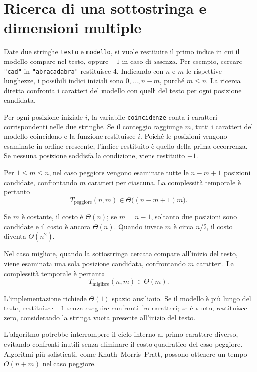 \clearpage

\section{Ricerca di una sottostringa e dimensioni multiple}
\label{sec:fi-complessita-sottostringa}

Date due stringhe \texttt{testo} e \texttt{modello}, si vuole
restituire il primo indice in cui il modello compare nel testo,
oppure \(-1\) in caso di assenza. Per esempio, cercare
\texttt{"cad"} in \texttt{"abracadabra"} restituisce \(4\).
Indicando con \(n\) e \(m\) le rispettive lunghezze, i possibili
indici iniziali sono \(0,\ldots,n-m\), purché \(m\le n\).
La ricerca diretta confronta i caratteri del modello con quelli
del testo per ogni posizione candidata.



Per ogni posizione iniziale \(i\), la variabile
\texttt{coincidenze} conta i caratteri corrispondenti nelle due
stringhe. Se il conteggio raggiunge \(m\), tutti i caratteri
del modello coincidono e la funzione restituisce \(i\).
Poiché le posizioni vengono esaminate in ordine crescente,
l'indice restituito è quello della prima occorrenza.
Se nessuna posizione soddisfa la condizione, viene restituito \(-1\).

Per \(1\le m\le n\), nel caso peggiore vengono esaminate tutte
le \(n-m+1\) posizioni candidate, confrontando \(m\) caratteri
per ciascuna. La complessità temporale è pertanto
\[
  T_{\mathrm{peggiore}}(n,m)
  \in\Theta\bigl((n-m+1)m\bigr).
\]

Se \(m\) è costante, il costo è \(\Theta(n)\); se \(m=n-1\),
soltanto due posizioni sono candidate e il costo è ancora
\(\Theta(n)\). Quando invece \(m\) è circa \(n/2\), il costo
diventa \(\Theta(n^2)\).

Nel caso migliore, quando la sottostringa cercata compare all'inizio
del testo, viene esaminata una sola posizione candidata, confrontando
\(m\) caratteri. La complessità temporale è pertanto
\[
  T_{\mathrm{migliore}}(n,m)
  \in\Theta(m).
\]

L'implementazione richiede \(\Theta(1)\) spazio ausiliario.
Se il modello è più lungo del testo, restituisce \(-1\) senza
eseguire confronti fra caratteri; se è vuoto, restituisce
zero, considerando la stringa vuota presente all'inizio del testo.

L'algoritmo potrebbe interrompere il ciclo interno al primo
carattere diverso, evitando confronti inutili senza eliminare
il costo quadratico del caso peggiore. Algoritmi più sofisticati,
come Knuth--Morris--Pratt, possono ottenere un tempo
\(O(n+m)\) nel caso peggiore.

